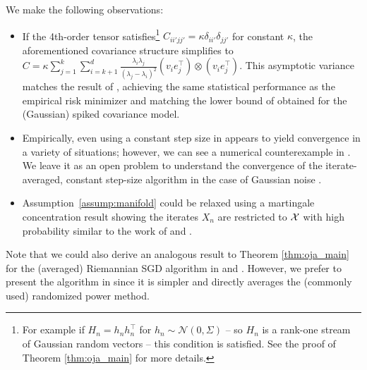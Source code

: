 We  make the following observations:
\begin{itemize}
\vspace*{-6pt}
  \item If the 4th-order tensor satisfies\footnote{For example if $H_n = h_n h_n^\top$ for $h_n \sim \mathcal{N}(0, \Sigma)$ -- so $H_n$ is a rank-one stream of Gaussian random vectors -- this condition is satisfied. See the proof of Theorem \ref{thm:oja_main} for more details.} $C_{ii'jj'} = \kappa \delta_{ii'}\delta_{jj'}$ for constant $\kappa$, the aforementioned covariance structure simplifies to 
$
    C = \kappa \sum_{j=1}^k\sum_{i=k+1}^d\frac{{\lambda_i \lambda_j}}{(\lambda_j-\lambda_i)^2} (v_i e_j^\top) \otimes (v_{i} e_{j}^\top)
    $.
  This asymptotic variance matches the result
  of \citet{reiss2016non}, achieving the same statistical performance as the empirical risk minimizer and matching the lower bound
  of \citet{CaiMaWu13} obtained for the (Gaussian) spiked covariance model. 
  \vspace*{-6pt}
  \item Empirically, even using a constant step size in  appears to yield convergence in a variety of situations; however, we can see a numerical counterexample in . We leave it as an open problem to understand the convergence of the iterate-averaged, constant step-size algorithm in the case of Gaussian noise \citep{BouLac85}.
  \vspace*{-6pt}
 \item Assumption~\ref{assump:manifold} could be relaxed using a martingale concentration result showing the iterates $X_n$ are restricted to $\mathcal{X}$ with high probability similar to the work of \citet{shamir16b} and \citet{AllenLi2017-streampca}.
 \vspace*{-4pt}
\end{itemize}
Note that we could also derive an analogous result to Theorem \ref{thm:oja_main} for the (averaged) Riemannian SGD algorithm in  and . However, we prefer to present the algorithm in  since it is simpler and directly averages the (commonly used) randomized power method.
